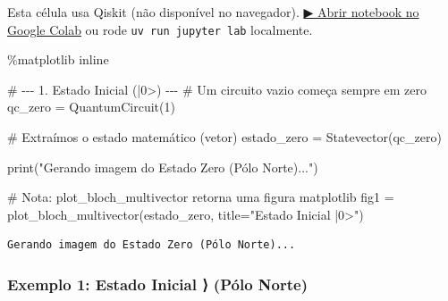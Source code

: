 \documentclass[
  brazilian,
]{report}
\newenvironment{Shaded}{\begin{snugshade}}{\end{snugshade}}
\newcommand{\BuiltInTok}[1]{\textcolor[rgb]{0.00,0.23,0.31}{#1}}
\newcommand{\CommentTok}[1]{\textcolor[rgb]{0.37,0.37,0.37}{#1}}
\newcommand{\DecValTok}[1]{\textcolor[rgb]{0.68,0.00,0.00}{#1}}
\newcommand{\NormalTok}[1]{\textcolor[rgb]{0.00,0.23,0.31}{#1}}
\newcommand{\OperatorTok}[1]{\textcolor[rgb]{0.37,0.37,0.37}{#1}}
\newcommand{\StringTok}[1]{\textcolor[rgb]{0.13,0.47,0.30}{#1}}
\begin{document}
\begin{tcolorbox}[enhanced jigsaw, arc=.35mm, bottomrule=.15mm, bottomtitle=1mm, breakable, colback=white, colbacktitle=quarto-callout-warning-color!10!white, colframe=quarto-callout-warning-color-frame, coltitle=black, left=2mm, leftrule=.75mm, opacityback=0, opacitybacktitle=0.6, rightrule=.15mm, title=\textcolor{quarto-callout-warning-color}{\faExclamationTriangle}\hspace{0.5em}{⚛️ Célula Qiskit --- execute no Colab ou localmente}, titlerule=0mm, toprule=.15mm, toptitle=1mm]

Esta célula usa Qiskit (não disponível no navegador).
\href{https://colab.research.google.com/github/maxwellamaral/aula-quantum/blob/main/notebooks/01-intro.ipynb}{▶
Abrir notebook no Google Colab} ou rode \texttt{uv\ run\ jupyter\ lab}
localmente.

\begin{Shaded}
\begin{Highlighting}[]

\OperatorTok{\%}\NormalTok{matplotlib inline}

\CommentTok{\# {-}{-}{-} 1. Estado Inicial (|0\textgreater{}) {-}{-}{-}}
\CommentTok{\# Um circuito vazio começa sempre em zero}
\NormalTok{qc\_zero }\OperatorTok{=}\NormalTok{ QuantumCircuit(}\DecValTok{1}\NormalTok{)}

\CommentTok{\# Extraímos o estado matemático (vetor)}
\NormalTok{estado\_zero }\OperatorTok{=}\NormalTok{ Statevector(qc\_zero)}

\BuiltInTok{print}\NormalTok{(}\StringTok{"Gerando imagem do Estado Zero (Pólo Norte)..."}\NormalTok{)}

\CommentTok{\# Nota: plot\_bloch\_multivector retorna uma figura matplotlib}
\NormalTok{fig1 }\OperatorTok{=}\NormalTok{ plot\_bloch\_multivector(estado\_zero, title}\OperatorTok{=}\StringTok{"Estado Inicial |0\textgreater{}"}\NormalTok{)}
\end{Highlighting}
\end{Shaded}

\end{tcolorbox}

\begin{verbatim}
Gerando imagem do Estado Zero (Pólo Norte)...
\end{verbatim}

\subsubsection{Exemplo 1: Estado Inicial ⟩ (Pólo
Norte)}\label{exemplo-1-estado-inicial-0-puxf3lo-norte}
\end{document}
